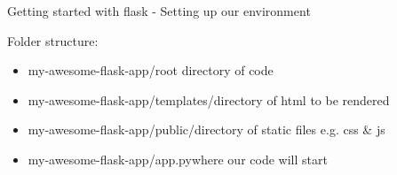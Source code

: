 \documentclass{beamer}
\begin{document}
\begin{frame}{Getting started with flask - Setting up our environment}

\pause
Folder structure:
\begin{itemize}
  \item[] my-awesome-flask-app/\pause \qquad root directory of code\pause
  \item[] my-awesome-flask-app/templates/\pause \qquad directory of html to be rendered\pause
  \item[] my-awesome-flask-app/public/\pause \qquad directory of static files e.g. css \& js\pause
  \item[] my-awesome-flask-app/app.py\pause \qquad where our code will start
\end{itemize}

\end{frame}
\end{document}
